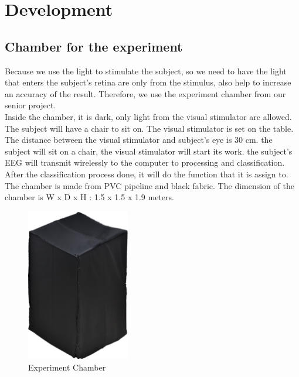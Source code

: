 \chapter{Development}

\label{ch:Development}

\setlength{\parindent}{4em}
\setlength{\parskip}{1em}
\renewcommand{\baselinestretch}{1.5}

\section{Chamber for the experiment}
\hspace{1.5cm}Because we use the light to stimulate the subject, so we need to have the light that enters the subject's retina are only from the stimulus, also help to increase an accuracy of the result. Therefore, we use the experiment chamber from our senior project.\cite{senior}\\

Inside the chamber, it is dark, only light from the visual stimulator are allowed. The subject will have a chair to sit on. The visual stimulator is set on the table. The distance between the visual stimulator and subject's eye is 30 cm. the subject will sit on a chair, the visual stimulator will start its work. the subject's EEG will transmit wirelessly to the computer to processing and classification. After the classification process done, it will do the function that it is assign to. \\
The chamber is made from PVC pipeline and black fabric. The dimension of the chamber is W x D x H : 1.5 x 1.5 x 1.9 meters.\\
\begin{figure}[ht]
	\centering
	\includegraphics[width=0.4\textwidth]{chapter6/blackbox.jpg}
	\caption{Experiment Chamber}
\end{figure}


